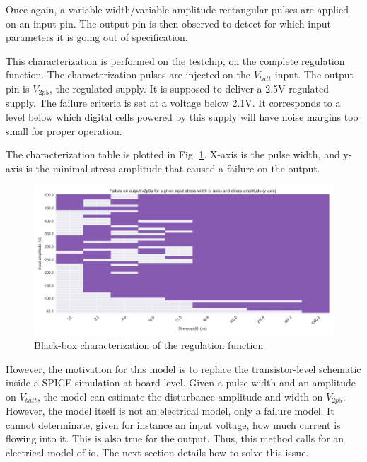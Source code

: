 Once again, a variable width/variable amplitude rectangular pulses are applied on an input pin.
The output pin is then observed to detect for which input parameters it is going out of specification.

This characterization is performed on the testchip, on the complete regulation function.
The characterization pulses are injected on the $V_{batt}$ input.
The output pin is $V_{2p5}$, the regulated supply.
It is supposed to deliver a 2.5V regulated supply.
The failure criteria is set at a voltage below 2.1V.
It corresponds to a level below which digital cells powered by this supply will have noise margins too small for proper operation.


The characterization table is plotted in Fig. \ref{fig:cz-black-box}.
X-axis is the pulse width, and y-axis is the minimal stress amplitude that caused a failure on the output.

\begin{figure}[!h]
  \centering
  \includegraphics[width=\textwidth]{src/4/figures/black_box_regulator.png}
  \caption{Black-box characterization of the regulation function}
  \label{fig:cz-black-box}
\end{figure}

However, the motivation for this model is to replace the transistor-level schematic inside a SPICE simulation at board-level.
Given a pulse width and an amplitude on $V_{batt}$, the model can estimate the disturbance amplitude and width on $V_{2p5}$.
However, the model itself is not an electrical model, only a failure model.
It cannot determinate, given for instance an input voltage, how much current is flowing into it.
This is also true for the output.
Thus, this method calls for an electrical model of \gls{io}.
The next section details how to solve this issue.

